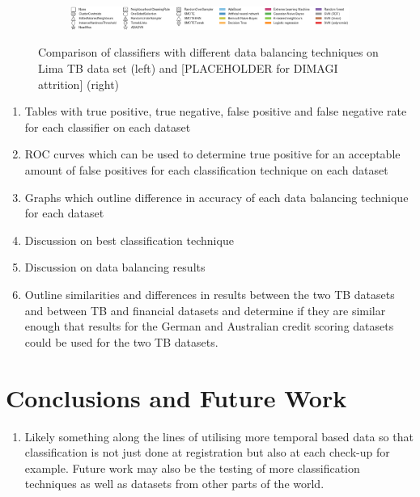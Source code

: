 \documentclass{sig-alternate-05-2015}
\begin{document}
\begin{figure}
\begin{subfigure}{.5\textwidth}
			\label{fig:res}
		\end{subfigure}
		\vspace*{-0.5cm}\hspace*{-3cm}\begin{subfigure}{\textwidth}
			\includegraphics[scale=0.6]{legend}
			\label{fig:res}
		\end{subfigure}
		\caption{Comparison of classifiers with different data balancing techniques on Lima TB data set (left) and [PLACEHOLDER for DIMAGI attrition] (right)}
	\end{figure}
	

	\label{results}
	\begin{enumerate}
		\item Tables with true positive, true negative, false positive and false negative rate for each classifier on each dataset
		\item ROC curves which can be used to determine true positive for an acceptable amount of false positives for each classification technique on each dataset
		\item Graphs which outline difference in accuracy of each data balancing technique for each dataset
		\item Discussion on best classification technique
		\item Discussion on data balancing results
		\item Outline similarities and differences in results between the two TB datasets and between TB and financial datasets and determine if they are similar enough that results for the German and Australian credit scoring datasets could be used for the two TB datasets.
	\end{enumerate}
	
	\section{Conclusions and Future Work}
	\begin{enumerate}
		\item Likely something along the lines of utilising more temporal based data so that classification is not just done at registration but also at each check-up for example. Future work may also be the testing of more classification techniques as well as datasets from other parts of the world.
	\end{enumerate}
	
	
\end{document}
